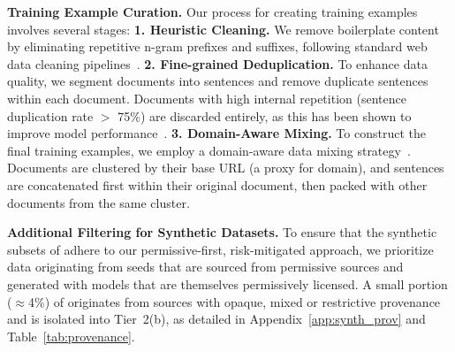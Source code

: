 
\textbf{Training Example Curation.}
\label{sec:training_curation}
Our process for creating training examples involves several stages: \textbf{1. Heuristic Cleaning.} We remove boilerplate content by eliminating repetitive n-gram prefixes and suffixes, following standard web data cleaning pipelines~\citep{raffel2020exploring}. \textbf{2. Fine-grained Deduplication.} To enhance data quality, we segment documents into sentences and remove duplicate sentences within each document. Documents with high internal repetition (sentence duplication rate $>$ 75\%) are discarded entirely, as this has been shown to improve model performance~\citep{lee2022deduplicating}. \textbf{3. Domain-Aware Mixing.} To construct the final training examples, we employ a domain-aware data mixing strategy~\citep{xie2023doremioptimizingdatamixtures}. Documents are clustered by their base URL (a proxy for domain), and sentences are concatenated first within their original document, then packed with other documents from the same cluster.


\textbf{Additional Filtering for Synthetic Datasets.} To ensure that the synthetic subsets of \MixtureVitae{} adhere to our permissive-first, risk-mitigated approach, we prioritize data originating from seeds that are sourced from permissive sources and generated with models that are themselves permissively licensed. A small portion ($\approx$4\%) of \MixtureVitae{} originates from sources with opaque, mixed or restrictive provenance and is isolated into Tier~2(b), as detailed in Appendix~\ref{app:synth_prov} and Table~\ref{tab:provenance}.

